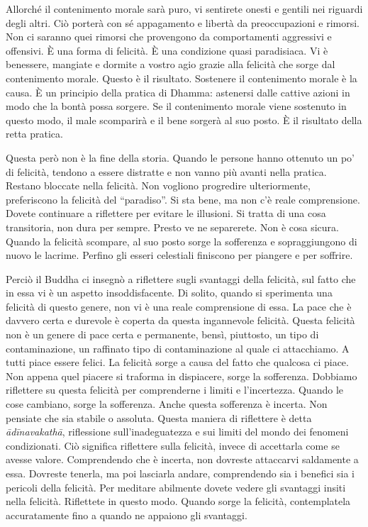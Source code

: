 Allorché il contenimento morale sarà puro, vi sentirete onesti e gentili
nei riguardi degli altri. Ciò porterà con sé appagamento e libertà da
preoccupazioni e rimorsi. Non ci saranno quei rimorsi che provengono da
comportamenti aggressivi e offensivi. È una forma di felicità. È una
condizione quasi paradisiaca. Vi è benessere, mangiate e dormite a
vostro agio grazie alla felicità che sorge dal contenimento morale.
Questo è il risultato. Sostenere il contenimento morale è la causa. È un
principio della pratica di Dhamma: astenersi dalle cattive azioni in
modo che la bontà possa sorgere. Se il contenimento morale viene
sostenuto in questo modo, il male scomparirà e il bene sorgerà al suo
posto. È il risultato della retta pratica.

Questa però non è la fine della storia. Quando le persone hanno ottenuto
un po' di felicità, tendono a essere distratte e non vanno più avanti
nella pratica. Restano bloccate nella felicità. Non vogliono progredire
ulteriormente, preferiscono la felicità del ``paradiso''. Si sta bene,
ma non c'è reale comprensione. Dovete continuare a riflettere per
evitare le illusioni. Si tratta di una cosa transitoria, non dura per
sempre. Presto ve ne separerete. Non è cosa sicura. Quando la felicità
scompare, al suo posto sorge la sofferenza e sopraggiungono di nuovo le
lacrime. Perfino gli esseri celestiali finiscono per piangere e per
soffrire.

Perciò il Buddha ci insegnò a riflettere sugli svantaggi della felicità,
sul fatto che in essa vi è un aspetto insoddisfacente. Di solito, quando
si sperimenta una felicità di questo genere, non vi è una reale
comprensione di essa. La pace che è davvero certa e durevole è coperta
da questa ingannevole felicità. Questa felicità non è un genere di pace
certa e permanente, bensì, piuttosto, un tipo di contaminazione, un
raffinato tipo di contaminazione al quale ci attacchiamo. A tutti piace
essere felici. La felicità sorge a causa del fatto che qualcosa ci
piace. Non appena quel piacere si traforma in dispiacere, sorge la
sofferenza. Dobbiamo riflettere su questa felicità per comprenderne i
limiti e l'incertezza. Quando le cose cambiano, sorge la sofferenza.
Anche questa sofferenza è incerta. Non pensiate che sia stabile o
assoluta. Questa maniera di riflettere è detta \emph{ādīnavakathā},
riflessione sull'inadeguatezza e sui limiti del mondo dei fenomeni
condizionati. Ciò significa riflettere sulla felicità, invece di
accettarla come se avesse valore. Comprendendo che è incerta, non
dovreste attaccarvi saldamente a essa. Dovreste tenerla, ma poi
lasciarla andare, comprendendo sia i benefici sia i pericoli della
felicità. Per meditare abilmente dovete vedere gli svantaggi insiti
nella felicità. Riflettete in questo modo. Quando sorge la felicità,
contemplatela accuratamente fino a quando ne appaiono gli svantaggi.


